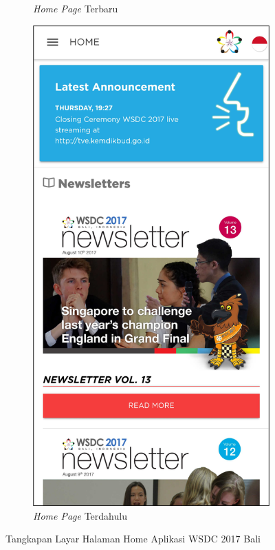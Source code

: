 \begin{figure}[H]
\begin{subfigure}[b]{0.3\textwidth}
         \caption{\textit{Home Page} Terbaru}
         \label{fig:ssHome}
     \end{subfigure}
     \hspace*{0.5in}
     \begin{subfigure}[b]{0.3\textwidth}
         \centering
         \includegraphics[width=\textwidth]{Gambar/HomePage.png}
         \caption{\textit{Home Page} Terdahulu}
         \label{fig:ssHomeOld}
     \end{subfigure}
        \caption{Tangkapan Layar Halaman Home Aplikasi WSDC 2017 Bali}
        \label{fig:ssApk1}
\end{figure}



